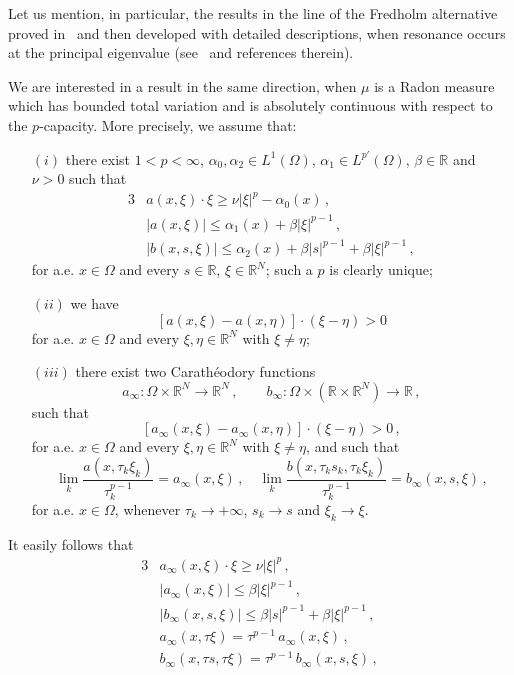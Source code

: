 \documentclass[twoside,reqno]{amsart}
\numberwithin{equation}{section}
\theoremstyle{definition}
\newcommand{\R}{\mathbb{R}}
\begin{document}
Let us mention, in particular, the results in the line of
the Fredholm alternative proved 
in~\cite{boccardo_drabek_giachetti_kucera1986} and then
developed with detailed descriptions, when resonance
occurs at the principal eigenvalue
(see~\cite{takac2010} and references therein).
\par
We are interested in a result in the same direction, when
$\mu$ is a Radon measure which has bounded total variation 
and is absolutely continuous with respect to the $p$-capacity.
More precisely, we assume that:
\begin{itemize}
\item[$(i)$]
there exist $1<p<\infty$, $\alpha_0, \alpha_2\in L^1(\Omega)$, 
$\alpha_1\in L^{p'}(\Omega)$, $\beta\in\R$ and $\nu>0$
such that
\begin{alignat*}{3}
&a(x,\xi)\cdot\xi \geq \nu |\xi|^p - \alpha_0(x)\,,\\
&|a(x,\xi)| \leq \alpha_1(x) + \beta|\xi|^{p-1} \,,\\
&|b(x,s,\xi)|\leq \alpha_2(x) + \beta|s|^{p-1} +\beta|\xi|^{p-1}\,,
\end{alignat*}
for a.e. $x\in\Omega$ and every $s\in\R$, $\xi\in\R^N$;
such a $p$ is clearly unique;
\item[$(ii)$]
we have
\[
[a(x,\xi)-a(x,\eta)]\cdot(\xi-\eta) >0
\]
for a.e. $x\in\Omega$ and every $\xi,\eta\in\R^N$ 
with $\xi\neq\eta$;
\item[$(iii)$]
there exist two Carath\'eodory functions
\[
a_{\infty}:\Omega\times\R^N\rightarrow\R^N\,,\qquad
b_{\infty}:\Omega\times(\R\times\R^N)\rightarrow\R\,,
\]
such that
\[
[a_{\infty}(x,\xi)-a_{\infty}(x,\eta)]\cdot(\xi-\eta) >0\,,
\]
for a.e. $x\in\Omega$ and every $\xi,\eta\in\R^N$ 
with $\xi\neq\eta$, and such that
\[
\lim_k \frac{a(x,\tau_k\xi_k)}{\tau_k^{p-1}} =
a_{\infty}(x,\xi)\,,\quad
\lim_k \frac{b(x,\tau_ks_k,\tau_k\xi_k)}{\tau_k^{p-1}} =
b_{\infty}(x,s,\xi)\,,
\]
for a.e. $x\in\Omega$,
whenever $\tau_k\to +\infty$, $s_k\to s$ and $\xi_k\to \xi$.
\end{itemize}
%
It easily follows that
\begin{alignat}{3}
\label{eq:ainftycoerc}
&a_{\infty}(x,\xi)\cdot\xi \geq \nu |\xi|^p\,,\\
\label{eq:ainftyest}
&|a_{\infty}(x,\xi)| \leq \beta|\xi|^{p-1} \,,\\
\label{eq:binftyest}
&|b_{\infty}(x,s,\xi)|\leq \beta|s|^{p-1} +\beta|\xi|^{p-1}\,,\\
\label{eq:ainftyhom}
&a_{\infty}(x,\tau\xi) = \tau^{p-1}\, a_{\infty}(x,\xi)\,,\\
\label{eq:binftyhom}
&b_{\infty}(x,\tau s,\tau\xi) 
= \tau^{p-1} \,b_{\infty}(x,s,\xi)\,,
\end{alignat}
\end{document}
